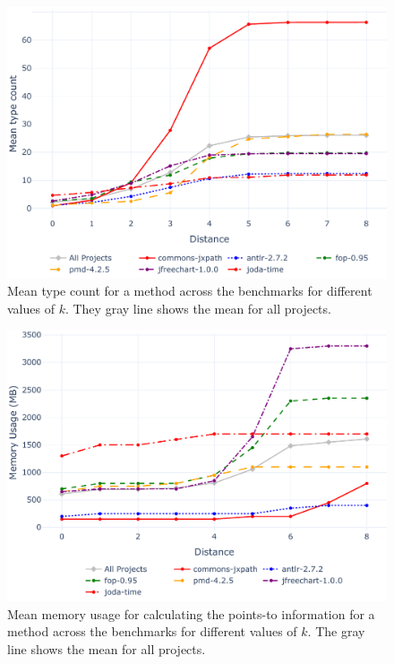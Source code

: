 \begin{figure}[htbp]
\centering
\includegraphics[width=\FigureWidth]{figures/type_count_evaluation.pdf}
\caption{Mean type count for a method across the benchmarks for different values of $k$. They gray line shows the mean for all projects.}
\label{fig:type_count}
\end{figure}

\begin{figure}[htbp]
\centering
\includegraphics[width=\FigureWidth]{figures/memory_usage_evaluation.pdf}
\caption{Mean memory usage for calculating the points-to information for a method across the benchmarks for different values of $k$. The gray line shows the mean for all projects.}
\label{fig:memory_usage}
\end{figure}

